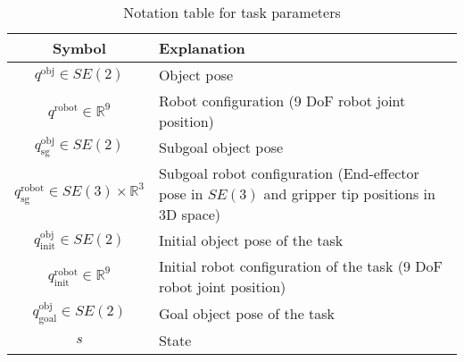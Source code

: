 \begin{table}[h!]
\large
\centering
\begin{adjustbox}{width=\columnwidth} %
\begin{tabular}{|c|p{}|} %
\hline
\textbf{Symbol} & \textbf{Explanation} \\ \hline
$q^{\text{obj}} \in SE(2)$ & Object pose \\ \hline
$q^{\text{robot}} \in \mathbb{R}^9$ & Robot configuration (9 DoF robot joint position) \\ \hline
$q^{\text{obj}}_\text{sg} \in SE(2)$ & Subgoal object pose \\ \hline
$q^{\text{robot}}_\text{sg} \in SE(3) \times \mathbb{R}^3$ & Subgoal robot configuration (End-effector pose in $SE(3)$ and gripper tip positions in 3D space) \\ \hline
$q^{\text{obj}}_{\text{init}} \in SE(2)$ & Initial object pose of the task \\ \hline
$q^{\text{robot}}_{\text{init}} \in \mathbb{R}^9$ & Initial robot configuration of the task (9 DoF robot joint position) \\ \hline
$q^{\text{obj}}_{\text{goal}} \in SE(2)$ & Goal object pose of the task \\ \hline
$s$ & State \\ \hline
\end{tabular}
\end{adjustbox}
\caption{Notation table for task parameters}
\label{tab:state_notation}
\end{table}
